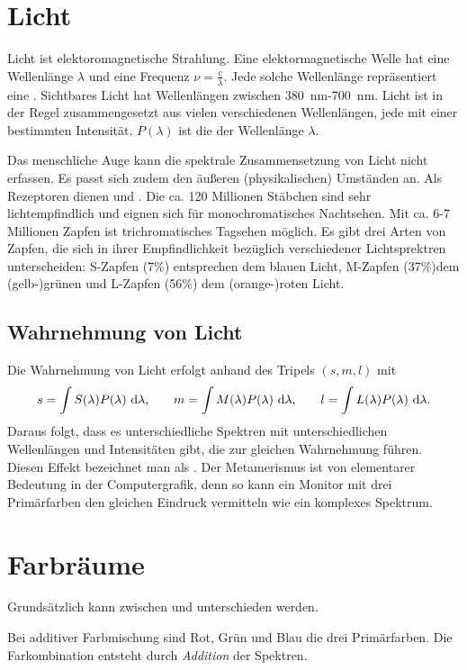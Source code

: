 \section{Licht}
Licht ist elektoromagnetische Strahlung.
Eine elektormagnetische Welle hat eine Wellenlänge $\lambda$ und eine Frequenz $\nu = \frac{c}{\lambda}$.
Jede solche Wellenlänge repräsentiert eine .
Sichtbares Licht hat Wellenlängen zwischen \SI{380}{\nano\meter}-\SI{700}{\nano\meter}.
Licht ist in der Regel zusammengesetzt aus vielen verschiedenen Wellenlängen, jede mit einer bestimmten Intensität. $P(\lambda)$ ist die  der Wellenlänge $\lambda$.

Das menschliche Auge kann die spektrale Zusammensetzung von Licht nicht erfassen.
Es passt sich zudem den äußeren (physikalischen) Umständen an.
Als Rezeptoren dienen  und .
Die ca. 120 Millionen Stäbchen sind sehr lichtempfindlich und eignen sich für monochromatisches Nachtsehen.
Mit ca. 6-7 Millionen Zapfen ist trichromatisches Tagsehen möglich.
Es gibt drei Arten von Zapfen, die sich in ihrer Empfindlichkeit bezüglich verschiedener Lichtsprektren unterscheiden:
S-Zapfen (7\%) entsprechen dem blauen Licht, M-Zapfen (37\%)dem (gelb-)grünen und L-Zapfen (56\%) dem (orange-)roten Licht.

\subsection{Wahrnehmung von Licht}
Die Wahrnehmung von Licht erfolgt anhand des Tripels $(s,m,l)$ mit
\[
	s = \int S(\lambda)P(\lambda) ~\mathrm{d}\lambda \text{,} \qquad
	m = \int M(\lambda)P(\lambda) ~\mathrm{d}\lambda \text{,} \qquad
	l = \int L(\lambda)P(\lambda) ~\mathrm{d}\lambda \text{.}
\]
Daraus folgt, dass es unterschiedliche Spektren mit unterschiedlichen Wellenlängen und Intensitäten gibt, die zur gleichen Wahrnehmung führen.
Diesen Effekt bezeichnet man als .
Der Metamerismus ist von elementarer Bedeutung in der Computergrafik, denn so kann ein Monitor mit drei Primärfarben den gleichen Eindruck vermitteln wie ein komplexes Spektrum.

\section{Farbräume}
Grundsätzlich kann zwischen  und  unterschieden werden.

Bei additiver Farbmischung sind Rot, Grün und Blau die drei Primärfarben.
Die Farkombination entsteht durch \emph{Addition} der Spektren.

